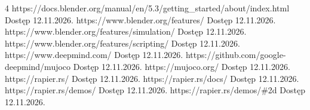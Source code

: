 \cleardoublepage
{}

\begin{thebibliography}{4}
 https://docs.blender.org/manual/en/5.3/getting\_started/about/index.html Dostęp 12.11.2026.
 https://www.blender.org/features/ Dostęp 12.11.2026.
 https://www.blender.org/features/simulation/ Dostęp 12.11.2026.
 https://www.blender.org/features/scripting/ Dostęp 12.11.2026.
 https://www.deepmind.com/ Dostęp 12.11.2026.
 https://github.com/google-deepmind/mujoco Dostęp 12.11.2026.
 https://mujoco.org/ Dostęp 12.11.2026.
 https://rapier.rs/ Dostęp 12.11.2026. 
 https://rapier.rs/docs/ Dostęp 12.11.2026.
 https://rapier.rs/demos/ Dostęp 12.11.2026.
 https://rapier.rs/demos/\#2d Dostęp 12.11.2026.
\end{thebibliography}

